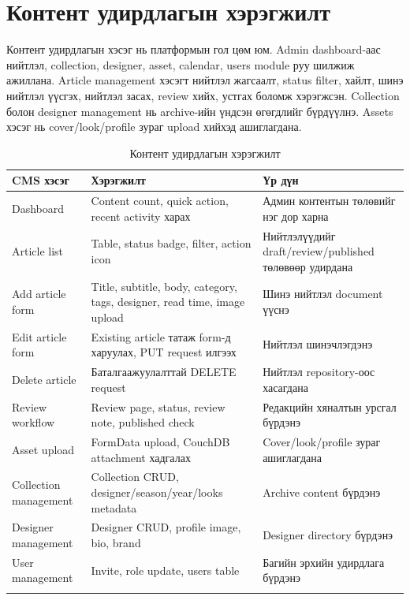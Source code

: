 \section{Контент удирдлагын хэрэгжилт}
Контент удирдлагын хэсэг нь платформын гол цөм юм. Admin dashboard-аас нийтлэл, collection, designer, asset, calendar, users module руу шилжиж ажиллана. Article management хэсэгт нийтлэл жагсаалт, status filter, хайлт, шинэ нийтлэл үүсгэх, нийтлэл засах, review хийх, устгах боломж хэрэгжсэн. Collection болон designer management нь archive-ийн үндсэн өгөгдлийг бүрдүүлнэ. Assets хэсэг нь cover/look/profile зураг upload хийхэд ашиглагдана.

\begin{longtable}{|L{0.22\textwidth}|L{0.34\textwidth}|L{0.30\textwidth}|}
  \hline
  \textbf{CMS хэсэг} & \textbf{Хэрэгжилт} & \textbf{Үр дүн} \\ \hline
  Dashboard & Content count, quick action, recent activity харах & Админ контентын төлөвийг нэг дор харна \\ \hline
  Article list & Table, status badge, filter, action icon & Нийтлэлүүдийг draft/review/published төлөвөөр удирдана \\ \hline
  Add article form & Title, subtitle, body, category, tags, designer, read time, image upload & Шинэ нийтлэл document үүснэ \\ \hline
  Edit article form & Existing article татаж form-д харуулах, PUT request илгээх & Нийтлэл шинэчлэгдэнэ \\ \hline
  Delete article & Баталгаажуулалттай DELETE request & Нийтлэл repository-оос хасагдана \\ \hline
  Review workflow & Review page, status, review note, published check & Редакцийн хяналтын урсгал бүрдэнэ \\ \hline
  Asset upload & FormData upload, CouchDB attachment хадгалах & Cover/look/profile зураг ашиглагдана \\ \hline
  Collection management & Collection CRUD, designer/season/year/looks metadata & Archive content бүрдэнэ \\ \hline
  Designer management & Designer CRUD, profile image, bio, brand & Designer directory бүрдэнэ \\ \hline
  User management & Invite, role update, users table & Багийн эрхийн удирдлага бүрдэнэ \\ \hline
  \caption{Контент удирдлагын хэрэгжилт}
  \label{tab:ch4-cms-implementation}\\
\end{longtable}

